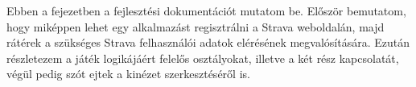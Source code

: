 Ebben a fejezetben a fejlesztési dokumentációt mutatom be. Először bemutatom, hogy miképpen lehet egy alkalmazást regisztrálni a Strava weboldalán, majd rátérek a szükséges Strava felhasználói adatok elérésének megvalósítására. Ezután részletezem a játék logikájáért felelős osztályokat, illetve a két rész kapcsolatát, végül pedig szót ejtek a kinézet szerkesztéséről is. 